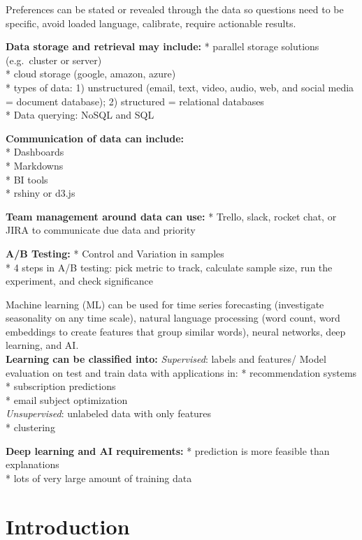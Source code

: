 \documentclass[]{book}
\begin{document}
Preferences can be stated or revealed through the data so questions need to be specific, avoid loaded language, calibrate, require actionable results.

\textbf{Data storage and retrieval may include: }
* parallel storage solutions (e.g.~cluster or server)\\
* cloud storage (google, amazon, azure)\\
* types of data: 1) unstructured (email, text, video, audio, web, and social media = document database); 2) structured = relational databases\\
* Data querying: NoSQL and SQL

\textbf{Communication of data can include: }\\
* Dashboards\\
* Markdowns\\
* BI tools\\
* rshiny or d3.js

\textbf{Team management around data can use: }
* Trello, slack, rocket chat, or JIRA to communicate due data and priority

\textbf{A/B Testing: }
* Control and Variation in samples\\
* 4 steps in A/B testing: pick metric to track, calculate sample size, run the experiment, and check significance

Machine learning (ML) can be used for time series forecasting (investigate seasonality on any time scale), natural language processing (word count, word embeddings to create features that group similar words), neural networks, deep learning, and AI.\\
\textbf{Learning can be classified into: }
\emph{Supervised}: labels and features/ Model evaluation on test and train data with applications in:
* recommendation systems\\
* subscription predictions\\
* email subject optimization\\
\emph{Unsupervised}: unlabeled data with only features\\
* clustering

\textbf{Deep learning and AI requirements: }
* prediction is more feasible than explanations\\
* lots of very large amount of training data

\hypertarget{introduction}{%
\chapter{Introduction}\label{introduction}}
\end{document}
